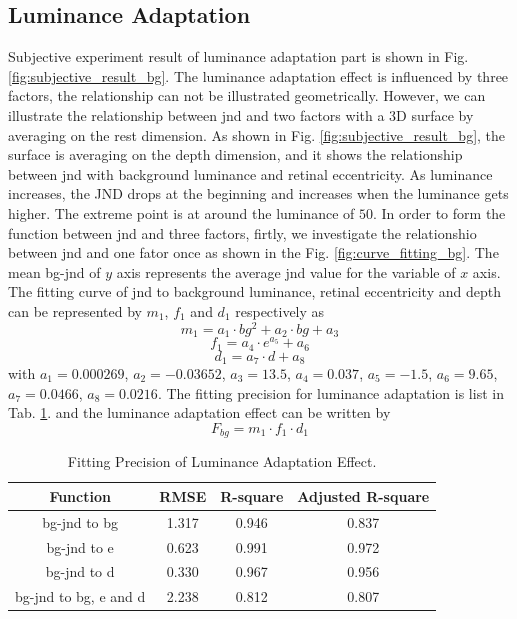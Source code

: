\documentclass[journal]{IEEEtran}
\begin{document}
\subsection{Luminance Adaptation}
Subjective experiment result of luminance adaptation part is shown in Fig. \ref{fig:subjective_result_bg}. The luminance adaptation effect is influenced by three factors, the relationship can not be illustrated geometrically. However, we can illustrate the relationship between jnd and two factors with a 3D surface by averaging on the rest dimension. As shown in Fig. \ref{fig:subjective_result_bg}, the surface is averaging on the depth dimension, and it shows the relationship between jnd with background luminance and retinal eccentricity. As luminance increases, the JND drops at the beginning and increases when the luminance gets higher. The extreme point is at around the luminance of $50$. In order to form the function between jnd and three factors, firtly, we investigate the relationshio between jnd and one fator once as shown in the Fig. \ref{fig:curve_fitting_bg}. The mean bg-jnd of $y$ axis represents the average jnd value for the variable of $x$ axis. The fitting curve of jnd to background luminance, retinal eccentricity and depth can be represented by $m_1$, $f_1$ and $d_1$ respectively as
\begin{equation}
m_1=a_1\cdot bg^2+a_2\cdot bg+a_3
\end{equation}
\begin{equation}
f_1=a_4\cdot e^{a_5}+a_6
\end{equation}
\begin{equation}
d_1=a_7\cdot d+a_8
\end{equation}
with $a_1=0.000269$, $a_2=-0.03652$, $a_3=13.5$, $a_4=0.037$, $a_5=-1.5$, $a_6=9.65$, $a_7=0.0466$, $a_8=0.0216$. The fitting precision for luminance adaptation is list in Tab. \ref{tab:fit_precition_bg}.
and the luminance adaptation effect can be written by
\begin{equation}
F_{bg}=m_1\cdot f_1 \cdot d_1
\end{equation}
\begin{table}[htbp]
	\centering
	\caption{Fitting Precision of Luminance Adaptation Effect.}
	\begin{tabular}{|c|c|c|c|}
				\hline
		Function & RMSE & R-square & Adjusted R-square \\
				\hline
		bg-jnd to bg & 1.317 & 0.946 & 0.837 \\
				\hline
		bg-jnd to e & 0.623 & 0.991 & 0.972 \\
				\hline
		bg-jnd to d & 0.330 & 0.967 & 0.956 \\
				\hline
		bg-jnd to bg, e and d & 2.238 & 0.812 & 0.807 \\
				\hline
	\end{tabular}%
	\label{tab:fit_precition_bg}%
\end{table}%
\end{document}

